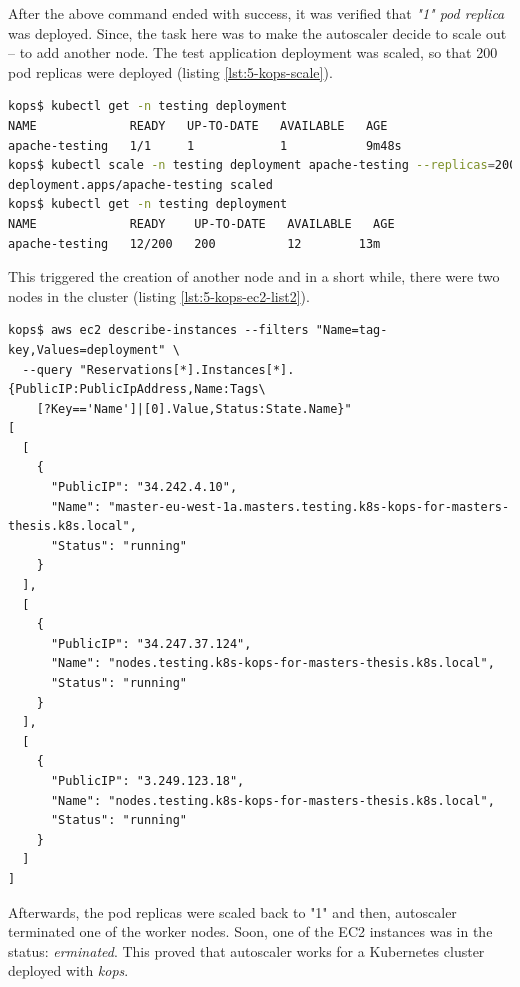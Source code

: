 After the above command ended with success, it was verified that \textit{"1" pod replica} was deployed. Since, the task here was to make the autoscaler decide to scale out -- to add another node. The test application deployment was scaled, so that 200 pod replicas were deployed (listing \ref{lst:5-kops-scale}).
\begin{lstlisting}[basicstyle=\scriptsize,xleftmargin=0cm,label=lst:5-kops-scale,caption={Scaling the test application pod replicas},captionpos=b,language=Bash]
kops$ kubectl get -n testing deployment
NAME             READY   UP-TO-DATE   AVAILABLE   AGE
apache-testing   1/1     1            1           9m48s
kops$ kubectl scale -n testing deployment apache-testing --replicas=200
deployment.apps/apache-testing scaled
kops$ kubectl get -n testing deployment
NAME             READY    UP-TO-DATE   AVAILABLE   AGE
apache-testing   12/200   200          12        13m
\end{lstlisting}

This triggered the creation of another node and in a short while, there were two nodes in the cluster (listing \ref{lst:5-kops-ec2-list2}).
\begin{lstlisting}[basicstyle=\scriptsize,xleftmargin=0cm,label=lst:5-kops-ec2-list2,caption={Listing the EC2 instances, 1 of them was created by autoscaler}]
kops$ aws ec2 describe-instances --filters "Name=tag-key,Values=deployment" \
  --query "Reservations[*].Instances[*].{PublicIP:PublicIpAddress,Name:Tags\
    [?Key=='Name']|[0].Value,Status:State.Name}"
[
  [
    {
      "PublicIP": "34.242.4.10",
      "Name": "master-eu-west-1a.masters.testing.k8s-kops-for-masters-thesis.k8s.local",
      "Status": "running"
    }
  ],
  [
    {
      "PublicIP": "34.247.37.124",
      "Name": "nodes.testing.k8s-kops-for-masters-thesis.k8s.local",
      "Status": "running"
    }
  ],
  [
    {
      "PublicIP": "3.249.123.18",
      "Name": "nodes.testing.k8s-kops-for-masters-thesis.k8s.local",
      "Status": "running"
    }
  ]
]
\end{lstlisting}

Afterwards, the pod replicas were scaled back to "1" and then, autoscaler terminated one of the worker nodes. Soon, one of the EC2 instances was in the status: \textit{erminated}. This proved that autoscaler works for a Kubernetes cluster deployed with \textit{kops}.

